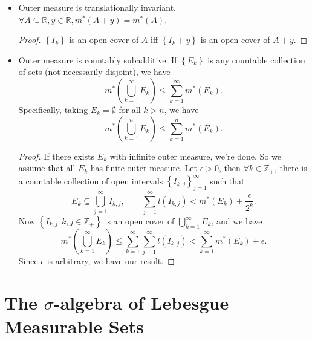 \documentclass[../main.tex]{subfiles}
\begin{document}
\begin{itemize}
\begin{proof}
		For an unbounded interval, $\forall n\in \mathbb{Z}_+$, there is a closed bounded interval $J_n \subseteq I, l(J_n) = n$, so $m^*(I) = \infty =l(I)$.
	\end{proof}
\item Outer measure is translationally invariant. $\forall A \subseteq \mathbb{R}, y\in \mathbb{R}, m^*(A+y) = m^*(A)$.
	\begin{proof}
		$\left\{ I_k \right\}$ is an open cover of $A$ iff $\left\{ I_k+y \right\}$ is an open cover of $A+y$.
	\end{proof}
\item Outer measure is countably subadditive. If $\left\{ E_k \right\}$ is any countable collection of sets (not necessarily disjoint), we have
	\begin{equation*}
		m^*\left( \bigcup_{k=1}^{\infty } E_k \right) \leq \sum_{k=1}^{\infty } m^*(E_k).
	\end{equation*}
	Specifically, taking $E_k = \emptyset $ for all $k>n$, we have
	\begin{equation*}
		m^*\left( \bigcup_{k=1}^{n} E_k \right) \leq \sum_{k=1}^{n} m^*(E_k).
	\end{equation*}
	\begin{proof}
		If there exists $E_k$ with infinite outer measure, we're done. So we assume that all $E_k$ has finite outer measure. Let $\epsilon>0$, then $\forall k\in \mathbb{Z}_+$, there is a countable collection of open intervals $\left\{ I_{k,j} \right\}_{j=1}^{\infty }$ such that 
		\begin{equation*}
			E_k \subseteq \bigcup_{j=1}^{\infty } I_{k,j},\qquad \sum_{j=1}^{\infty } l(I_{k,j}) < m^*(E_k) + \frac{\epsilon}{2^k}.
		\end{equation*}
		Now $\left\{ I_{k,j}: k,j\in \mathbb{Z}_+ \right\}$ is an open cover of $\displaystyle \bigcup_{k=1}^{\infty } E_k$, and we have
		\begin{equation*}
			m^*\left( \bigcup_{k=1}^{\infty } E_k \right) \leq \sum_{k=1}^{\infty } \sum_{j=1}^{\infty } l(I_{k,j}) < \sum_{k=1}^{\infty } m^*(E_k) + \epsilon.
		\end{equation*}
		Since $\epsilon$ is arbitrary, we have our result.
	\end{proof}
\end{itemize}

\section{The $\sigma$-algebra of Lebesgue Measurable Sets}
\end{document}
